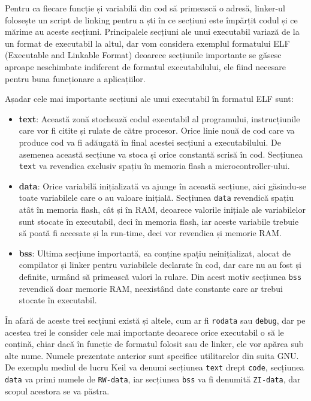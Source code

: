 \documentclass[12pt,a4paper,titlepage]{report}
\begin{document}
Pentru ca fiecare funcție și variabilă din cod să primească o adresă, linker-ul folosește un script de linking pentru a ști în ce secțiuni este împărțit codul și ce mărime au aceste secțiuni. Principalele secțiuni ale unui executabil variază de la un format de executabil la altul, dar vom considera exemplul formatului ELF (Executable and Linkable Format) \cite{elfSpec} deoarece secțiunile importante se găsesc aproape neschimbate indiferent de formatul executabilului, ele fiind necesare pentru buna funcționare a aplicațiilor.

Așadar cele mai importante secțiuni ale unui executabil în formatul ELF sunt:
\begin{itemize}
\item \textbf{text}: Această zonă stochează codul executabil al programului, instrucțiunile care vor fi citite și rulate de către procesor. Orice linie nouă de cod care va produce cod va fi adăugată în final acestei secțiuni a executabilului. De asemenea această secțiune va stoca și orice constantă scrisă în cod. Secțiunea \texttt{text} va revendica exclusiv spațiu în memoria flash a microcontroller-ului.
\item \textbf{data}: Orice variabilă inițializată va ajunge în această secțiune, aici găsindu-se toate variabilele care o au valoare inițială. Secțiunea \texttt{data} revendică spațiu atât în memoria flash, cât și în RAM, deoarece valorile inițiale ale variabilelor sunt stocate în executabil, deci în memoria flash, iar aceste variabile trebuie să poată fi accesate și la run-time, deci vor revendica și memorie RAM.
\item \textbf{bss}: Ultima secțiune importantă, ea conține spațiu neinițializat, alocat de compilator și linker pentru variabilele declarate în cod, dar care nu au fost și definite, urmând să primească valori la rulare. Din acest motiv secțiunea \texttt{bss} revendică doar memorie RAM, neexistând date constante care ar trebui stocate în executabil.
\end{itemize}

În afară de aceste trei secțiuni există și altele, cum ar fi \texttt{rodata} sau \texttt{debug}, dar pe acestea trei le consider cele mai importante deoarece orice executabil o să le conțină, chiar dacă în funcție de formatul folosit sau de linker, ele vor apărea sub alte nume. Numele prezentate anterior sunt specifice utilitarelor din suita GNU. De exemplu mediul de lucru Keil va denumi secțiunea \texttt{text} drept \texttt{code}, secțiunea \texttt{data} va primi numele de \texttt{RW-data}, iar secțiunea \texttt{bss} va fi denumită \texttt{ZI-data}, dar scopul acestora se va păstra.
\end{document}
